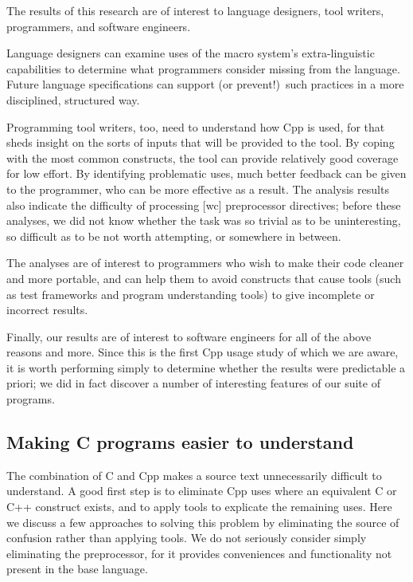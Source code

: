 \documentclass[11pt]{article}
\begin{document}
The results of this research are of interest to language designers, tool
writers, programmers, and software engineers.

Language designers can examine uses of the macro system's extra-linguistic
capabilities to determine what programmers consider missing from the
language.  Future language specifications can support (or prevent!)\ such
practices in a more disciplined, structured way.


Programming tool writers, too, need to understand how Cpp is used, for that
sheds insight on the sorts of inputs that will be provided to the tool.  By
coping with the most common constructs, the tool can provide relatively
good coverage for low effort.  By identifying problematic uses, much better
feedback can be given to the programmer, who can be more effective as a
result.  The analysis results also indicate the difficulty of processing [wc]
preprocessor directives; before these analyses, we did not know whether the
task was so trivial as to be uninteresting, so difficult as to be not worth
attempting, or somewhere in between.

The analyses are of interest to programmers who wish to make their code
cleaner and more portable, and can help them to avoid constructs that cause
tools (such as test frameworks and program understanding tools)
to give incomplete or incorrect results.


Finally, our results are of interest to software engineers for all of the
above reasons and more.  Since this is the first Cpp usage study of which
we are aware, it is worth performing simply to determine whether the
results were predictable a priori; we did in fact discover a number of
interesting features of our suite of programs.


\subsection{Making C programs easier to understand}

The combination of C and Cpp makes a source text unnecessarily difficult to
understand.  A good first step is to eliminate Cpp uses where an equivalent
C or C++ construct exists, and to apply tools to explicate the remaining
uses.  Here we discuss a few approaches to solving this problem by
eliminating the source of confusion rather than applying tools.  We do not
seriously consider simply eliminating the preprocessor, for it provides
conveniences and functionality not present in the base language.
\end{document}
